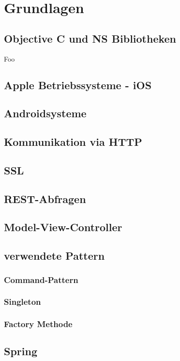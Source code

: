 \chapter{Grundlagen}

%
%    
%    
%    


    \section{Objective C und NS Bibliotheken}
        Foo\cite{Knuth:1998:ACP:280635}

    \section{Apple Betriebssysteme - iOS}
    \section{Androidsysteme}
    \section{Kommunikation via HTTP}
    \section{SSL}
    \section{REST-Abfragen}
    \section{Model-View-Controller}
    \section{verwendete Pattern}
        \subsection{Command-Pattern}
        \subsection{Singleton}
        \subsection{Factory Methode}
    \section{Spring}